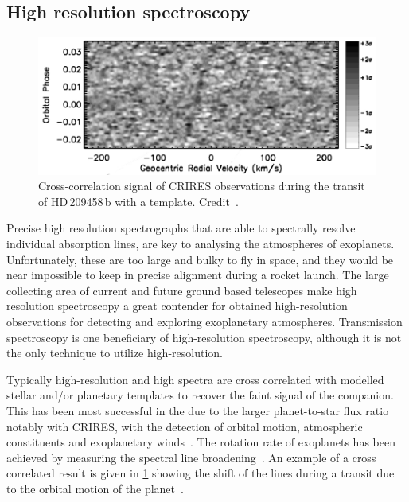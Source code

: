 \subsection{High resolution spectroscopy}
\label{subsec:high_resolution_spectroscopy}

\begin{figure}
    \centering
    \includegraphics[width=0.7\linewidth]{figures/introduction/snellen2010}
    \caption[Cross-correlation signal from {CRIRES} observations of HD\,209458\,b.]{Cross-correlation signal of {CRIRES} observations during the transit of HD\,209458\,b with a  template.
    Credit~\citet{snellen_orbital_2010}.}
    \label{fig:snellen2010}
\end{figure}

Precise high resolution spectrographs that are able to spectrally resolve individual absorption lines, are key to analysing the atmospheres of exoplanets.
Unfortunately, these are too large and bulky to fly in space, and they would be near impossible to keep in precise alignment during a rocket launch.
The large collecting area of current and future ground based telescopes make high resolution spectroscopy a great contender for obtained high-resolution observations for detecting and exploring exoplanetary atmospheres.
Transmission spectroscopy is one beneficiary of high-resolution spectroscopy, although it is not the only technique to utilize high-resolution.

Typically high-resolution and high \snr{} spectra are cross correlated with modelled stellar and/or planetary templates to recover the faint signal of the companion.
This has been most successful in the \nir{} due to the larger planet-to-star flux ratio
notably with CRIRES, with the detection of orbital motion, atmospheric constituents and exoplanetary winds~\citep[e.g.][]{snellen_orbital_2010, dekok_detection_2013, brogi_carbon_2014, brogi_rotation_2016, schwarz_evidence_2015}.
The rotation rate of exoplanets has been achieved by measuring the spectral line broadening~\citep{snellen_fast_2014, brogi_rotation_2016}.
An example of a cross correlated result is given in \cref{fig:snellen2010} showing the shift of the  lines during a transit due to the orbital motion of the planet~\citep{snellen_orbital_2010}.

